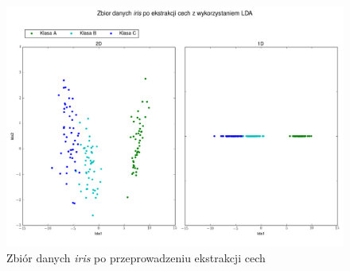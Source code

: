 \begin{figure}[ht!]
\centering
\includegraphics[scale=0.45]{res/showMeIris.png}
\caption[Caption for LOF]{Zbiór danych \textit{iris} po przeprowadzeniu ekstrakcji cech\label{showMeIris}}
\end{figure} 

